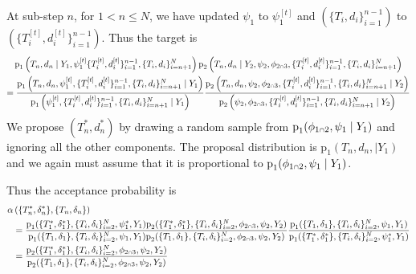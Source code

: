 \documentclass[
  10pt,
  a4paper,
]{article}
\let\Oldcap\cap
\renewcommand{\cap}{\mathrel{\mathsmaller{\Oldcap}}}
\newcommand{\pd}{\text{p}}
\begin{document}
At sub-step \(n\), for \(1 < n \leq N\), we have updated \(\psi_{1}\) to
\(\psi_{1}^{[t]}\) and \((\{T_{i}, d_{i}\}_{i = 1}^{n - 1})\) to
\((\{T_{i}^{[t]}, d_{i}^{[t]}\}_{i = 1}^{n - 1})\). Thus the target is
\begin{multline}
  \pd_{1} \left(T_{n}, d_{n} \mid Y_{1}, \psi_{1}^{[t]} \{T_{i}^{[t]}, d_{i}^{[t]}\}_{i = 1}^{n - 1}, \{T_{i}, d_{i}\}_{i = n + 1}^{N}\right)
  \pd_{2}\left(T_{n}, d_{n} \mid Y_{2}, \psi_{2}, \phi_{2 \cap 3}, \{T_{i}^{[t]}, d_{i}^{[t]}\}_{i = 1}^{n - 1}, \{T_{i}, d_{i}\}_{i = n + 1}^{N}\right) \\
  = \frac{
    \pd_{1} \left(T_{n}, d_{n}, \psi_{1}^{[t]}, \{T_{i}^{[t]}, d_{i}^{[t]}\}_{i = 1}^{n - 1}, \{T_{i}, d_{i}\}_{i = n + 1}^{N} \mid Y_{1} \right)
  } {
    \pd_{1} \left(\psi_{1}^{[t]}, \{T_{i}^{[t]}, d_{i}^{[t]}\}_{i = 1}^{n - 1}, \{T_{i}, d_{i}\}_{i = n + 1}^{N}\mid Y_{1}\right)
  }
  \frac {
    \pd_{2}\left(T_{n}, d_{n}, \psi_{2}, \phi_{2 \cap 3}, \{T_{i}^{[t]}, d_{i}^{[t]}\}_{i = 1}^{n - 1}, \{T_{i}, d_{i}\}_{i = n + 1}^{N} \mid Y_{2}\right)
  } {
    \pd_{2}\left(\psi_{2}, \phi_{2 \cap 3}, \{T_{i}^{[t]}, d_{i}^{[t]}\}_{i = 1}^{n - 1}, \{T_{i}, d_{i}\}_{i = n + 1}^{N}\mid Y_{2}\right)
  }
\end{multline} We propose \((T_{n}^{*}, d_{n}^{*})\) by drawing a random
sample from \(\pd_{1}(\phi_{1 \cap 2}, \psi_{1} \mid Y_{1})\) and
ignoring all the other components. The proposal distribution is
\(\pd_{1}(T_{n}, d_{n}, \mid Y_{1})\) and we again must assume that it
is proportional to \(\pd_{1}(\phi_{1 \cap 2}, \psi_{1} \mid Y_{1})\).

Thus the acceptance probability is \begin{equation}
\begin{aligned}
\alpha&\left(\{T_{n}^{*}, \delta_{n}^{*}\}, \{T_{n}, \delta_{n}\} \right) \\
&=
\frac {
  \pd_{1}(\{T_{1}^{*}, \delta_{1}^{*}\}, \{T_{i}, \delta_{i}\}_{i = 2}^{N}, \psi_{1}^{*}, Y_{1})
  \pd_{2}(\{T_{1}^{*}, \delta_{1}^{*}\}, \{T_{i}, \delta_{i}\}_{i = 2}^{N}, \phi_{2 \cap 3}, \psi_{2}, Y_{2})
} {
  \pd_{1}(\{T_{1}, \delta_{1}\}, \{T_{i}, \delta_{i}\}_{i = 2}^{N}, \psi_{1}, Y_{1})
  \pd_{2}(\{T_{1}, \delta_{1}\}, \{T_{i}, \delta_{i}\}_{i = 2}^{N}, \phi_{2 \cap 3}, \psi_{2}, Y_{2})
}
\frac{
  \pd_{1}(\{T_{1}, \delta_{1}\}, \{T_{i}, \delta_{i}\}_{i = 2}^{N}, \psi_{1}, Y_{1})
} {
  \pd_{1}(\{T_{1}^{*}, \delta_{1}^{*}\}, \{T_{i}, \delta_{i}\}_{i = 2}^{N}, \psi_{1}^{*}, Y_{1})
} \\
&= \frac {
  \pd_{2}(\{T_{1}^{*}, \delta_{1}^{*}\}, \{T_{i}, \delta_{i}\}_{i = 2}^{N}, \phi_{2 \cap 3}, \psi_{2}, Y_{2})
} {
  \pd_{2}(\{T_{1}, \delta_{1}\}, \{T_{i}, \delta_{i}\}_{i = 2}^{N}, \phi_{2 \cap 3}, \psi_{2}, Y_{2})
}
\end{aligned}
\end{equation}
\end{document}
